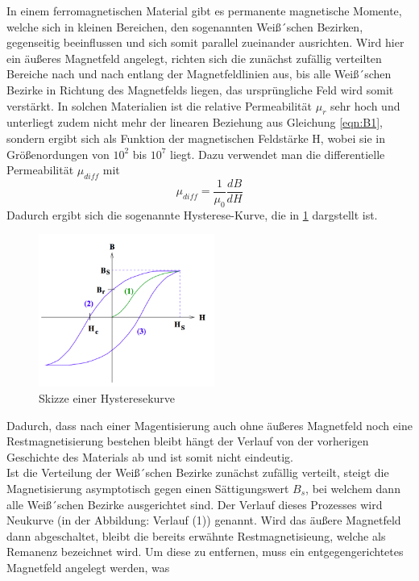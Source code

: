 \noindent In einem ferromagnetischen Material gibt es permanente magnetische Momente,
welche sich in kleinen Bereichen, den sogenannten Weiß´schen Bezirken, gegenseitig
beeinflussen und sich somit parallel zueinander ausrichten. Wird hier ein äußeres
Magnetfeld angelegt, richten sich die zunächst zufällig verteilten Bereiche nach und
nach entlang
der Magnetfeldlinien aus, bis alle Weiß´schen Bezirke in Richtung des Magnetfelds liegen,
das ursprüngliche Feld wird somit verstärkt.
In solchen Materialien ist die relative Permeabilität $\mu_r $ sehr hoch und unterliegt zudem
nicht mehr der linearen Beziehung aus Gleichung \ref{eqn:B1}, sondern ergibt sich als
Funktion der magnetischen Feldstärke H, wobei sie in Größenordungen von
$10^2$ bis $10^7$ liegt. Dazu verwendet man die differentielle Permeabilität
$\mu_{diff}$ mit
\begin{equation}
  \mu_{diff} = \frac{1}{\mu_0}\frac{dB}{dH}
  \label{eqn:mur}
\end{equation}
\noindent Dadurch ergibt sich die
sogenannte Hysterese-Kurve, die in \ref{fig:hysterese}
dargstellt ist.
\begin{figure}[H]
  \centering
  \includegraphics[height=5cm]{hysterese.png}
  \caption{Skizze einer Hysteresekurve \cite{skript}}
  \label{fig:hysterese}
\end{figure}
\noindent Dadurch, dass nach einer Magentisierung auch ohne äußeres Magnetfeld
noch eine Restmagnetisierung bestehen bleibt hängt der Verlauf von der vorherigen Geschichte
des Materials ab und ist somit nicht eindeutig.
\\
\noindent Ist die Verteilung der Weiß´schen Bezirke zunächst zufällig verteilt,
steigt die Magnetisierung asymptotisch gegen einen Sättigungswert $B_s$, bei welchem dann alle
Weiß´schen Bezirke ausgerichtet sind. Der Verlauf dieses Prozesses wird Neukurve
(in der Abbildung: Verlauf (1)) genannt. Wird das äußere Magnetfeld dann abgeschaltet,
bleibt die bereits erwähnte Restmagnetisieung, welche als Remanenz bezeichnet wird.
Um diese zu entfernen, muss ein entgegengerichtetes Magnetfeld angelegt werden, was
